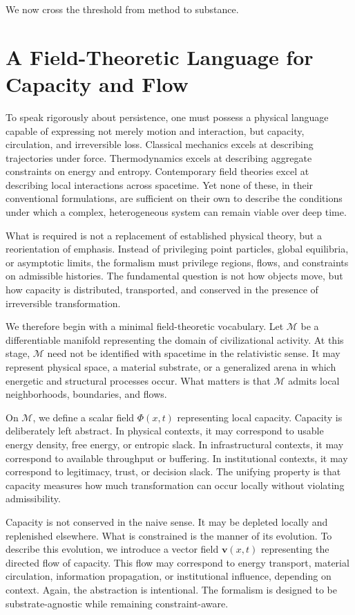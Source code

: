 \documentclass[12pt,oneside]{book}
\begin{document}
We now cross the threshold from method to substance.

\chapter{A Field-Theoretic Language for Capacity and Flow}

To speak rigorously about persistence, one must possess a physical language capable of expressing not merely motion and interaction, but capacity, circulation, and irreversible loss. Classical mechanics excels at describing trajectories under force. Thermodynamics excels at describing aggregate constraints on energy and entropy. Contemporary field theories excel at describing local interactions across spacetime. Yet none of these, in their conventional formulations, are sufficient on their own to describe the conditions under which a complex, heterogeneous system can remain viable over deep time.

What is required is not a replacement of established physical theory, but a reorientation of emphasis. Instead of privileging point particles, global equilibria, or asymptotic limits, the formalism must privilege regions, flows, and constraints on admissible histories. The fundamental question is not how objects move, but how capacity is distributed, transported, and conserved in the presence of irreversible transformation.

We therefore begin with a minimal field-theoretic vocabulary. Let \(\mathcal{M}\) be a differentiable manifold representing the domain of civilizational activity. At this stage, \(\mathcal{M}\) need not be identified with spacetime in the relativistic sense. It may represent physical space, a material substrate, or a generalized arena in which energetic and structural processes occur. What matters is that \(\mathcal{M}\) admits local neighborhoods, boundaries, and flows.

On \(\mathcal{M}\), we define a scalar field \(\Phi(x,t)\) representing local capacity. Capacity is deliberately left abstract. In physical contexts, it may correspond to usable energy density, free energy, or entropic slack. In infrastructural contexts, it may correspond to available throughput or buffering. In institutional contexts, it may correspond to legitimacy, trust, or decision slack. The unifying property is that capacity measures how much transformation can occur locally without violating admissibility.

Capacity is not conserved in the naive sense. It may be depleted locally and replenished elsewhere. What is constrained is the manner of its evolution. To describe this evolution, we introduce a vector field \(\mathbf{v}(x,t)\) representing the directed flow of capacity. This flow may correspond to energy transport, material circulation, information propagation, or institutional influence, depending on context. Again, the abstraction is intentional. The formalism is designed to be substrate-agnostic while remaining constraint-aware.
\end{document}
